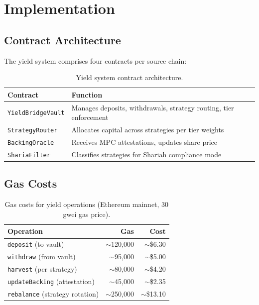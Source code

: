 \section{Implementation}
\label{sec:implementation}

\subsection{Contract Architecture}

The yield system comprises four contracts per source chain:

\begin{table}[h]
\centering
\small
\caption{Yield system contract architecture.}
\label{tab:contracts}
\begin{tabular}{@{}lp{4.8cm}@{}}
\toprule
\textbf{Contract} & \textbf{Function} \\
\midrule
\texttt{YieldBridgeVault} & Manages deposits, withdrawals, strategy routing, tier enforcement \\
\texttt{StrategyRouter} & Allocates capital across strategies per tier weights \\
\texttt{BackingOracle} & Receives MPC attestations, updates share price \\
\texttt{ShariaFilter} & Classifies strategies for Shariah compliance mode \\
\bottomrule
\end{tabular}
\end{table}

\subsection{Gas Costs}

\begin{table}[h]
\centering
\small
\caption{Gas costs for yield operations (Ethereum mainnet, 30 gwei gas price).}
\label{tab:gas_yield}
\begin{tabular}{@{}lrr@{}}
\toprule
\textbf{Operation} & \textbf{Gas} & \textbf{Cost} \\
\midrule
\texttt{deposit} (to vault) & $\sim$120,000 & $\sim$\$6.30 \\
\texttt{withdraw} (from vault) & $\sim$95,000 & $\sim$\$5.00 \\
\texttt{harvest} (per strategy) & $\sim$80,000 & $\sim$\$4.20 \\
\texttt{updateBacking} (attestation) & $\sim$45,000 & $\sim$\$2.35 \\
\texttt{rebalance} (strategy rotation) & $\sim$250,000 & $\sim$\$13.10 \\
\bottomrule
\end{tabular}
\end{table}

